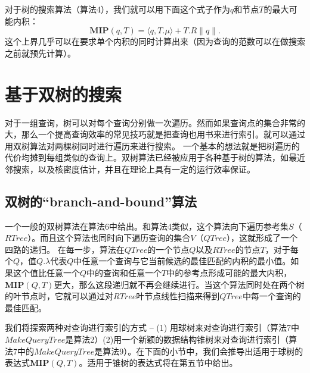 \documentclass[twocolumn,a4paper]{article}
\begin{document}
对于树的搜索算法（算法4），我们就可以用下面这个式子作为$q$和节点$T$的最大可能内积：
\begin{equation*}
\mathbf{MIP}(q,T) = \langle q,T.\mu\rangle + T.R\|q\|.
\end{equation*}
这个上界几乎可以在要求单个内积的同时计算出来（因为查询的范数可以在做搜索之前就预先计算）。

\section{基于双树的搜索}
对于一组查询，树可以对每个查询分别做一次遍历。然而如果查询点的集合非常的大，那么一个提高查询效率的常见技巧就是把查询也用书来进行索引。就可以通过用双树算法对两棵树同时进行遍历来进行搜索。
一个基本的想法就是把树遍历的代价均摊到每组类似的查询上。双树算法已经被应用于各种基于树的算法，如最近邻搜索，以及核密度估计，并且在理论上具有一定的运行效率保证。

\subsection{双树的“branch-and-bound”算法}
一个一般的双树算法在算法6中给出。和算法4类似，这个算法向下遍历参考集$S$（$RTree$）。而且这个算法也同时向下遍历查询的集合$V$（$QTree$），这就形成了一个四路的递归。
在每一步，算法在$QTree$的一个节点$Q$以及$RTree$的节点$T$，对于每个$Q$，值$Q.\lambda$代表$Q$中任意一个查询与它当前候选的最佳匹配的内积的最小值。如果这个值比任意一个$Q$中的查询和任意一个$T$中的参考点形成可能的最大内积，$\mathbf{MIP}(Q,T)$更大，那么这段递归就不再会继续进行。当这个算法同时处在两个树的叶节点时，它就可以通过对$RTree$叶节点线性扫描来得到$QTree$中每一个查询的最佳匹配。

我们将探索两种对查询进行索引的方式 -- (1) 用球树来对查询进行索引（算法7中$MakeQueryTree$是算法2）(2)用一个新颖的数据结构锥树来对查询进行索引（算法7中的$MakeQueryTree$是算法9）。在下面的小节中，我们会推导出适用于球树的表达式$\mathbf{MIP}(Q,T)$。适用于锥树的表达式将在第五节中给出。
\end{document}

